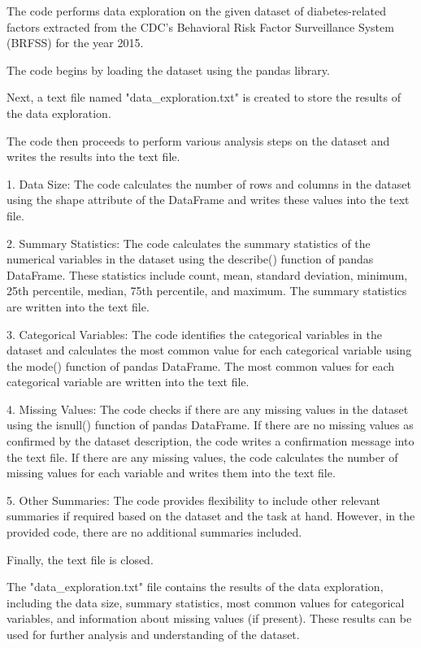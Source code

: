 \documentclass[11pt]{article}
\begin{document}
The code performs data exploration on the given dataset of diabetes-related factors extracted from the CDC's Behavioral Risk Factor Surveillance System (BRFSS) for the year 2015. 

The code begins by loading the dataset using the pandas library. 

Next, a text file named "data\_exploration.txt" is created to store the results of the data exploration.

The code then proceeds to perform various analysis steps on the dataset and writes the results into the text file.

1. Data Size:
   The code calculates the number of rows and columns in the dataset using the shape attribute of the DataFrame and writes these values into the text file.

2. Summary Statistics:
   The code calculates the summary statistics of the numerical variables in the dataset using the describe() function of pandas DataFrame. 
   These statistics include count, mean, standard deviation, minimum, 25th percentile, median, 75th percentile, and maximum.
   The summary statistics are written into the text file.

3. Categorical Variables:
   The code identifies the categorical variables in the dataset and calculates the most common value for each categorical variable using the mode() function of pandas DataFrame.
   The most common values for each categorical variable are written into the text file.

4. Missing Values:
   The code checks if there are any missing values in the dataset using the isnull() function of pandas DataFrame.
   If there are no missing values as confirmed by the dataset description, the code writes a confirmation message into the text file.
   If there are any missing values, the code calculates the number of missing values for each variable and writes them into the text file.

5. Other Summaries:
   The code provides flexibility to include other relevant summaries if required based on the dataset and the task at hand.
   However, in the provided code, there are no additional summaries included.

Finally, the text file is closed.

The "data\_exploration.txt" file contains the results of the data exploration, including the data size, summary statistics, most common values for categorical variables, and information about missing values (if present).
These results can be used for further analysis and understanding of the dataset.
\end{document}
